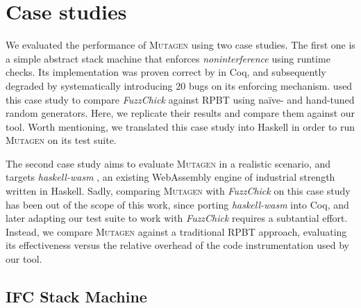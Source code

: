\documentclass[sigconf, anonymous, review]{acmart}
\newcommand{\fuzzchick}{\textit{FuzzChick}\xspace}
\newcommand{\mutagen}{\textsc{Mutagen}\xspace}
\begin{document}




\section{Case studies}
\label{sec:casestudies}

We evaluated the performance of \mutagen using two case studies.
%
The first one is a simple abstract stack machine that enforces
\emph{noninterference} \cite{goguen1982security} using runtime checks.
%
Its implementation was proven correct by \citeauthor{10.1145/2578855.2535839}
\citeyearpar{10.1145/2578855.2535839} in Coq, and subsequently degraded by
systematically introducing 20 bugs on its enforcing mechanism.
%
\citeauthor{lampropoulos2019coverage} used this case study to compare \fuzzchick
against RPBT using na\"ive- and hand-tuned random generators.
%
Here, we replicate their results and compare them against our tool.
%
Worth mentioning, we translated this case study into Haskell in order to run
\mutagen on its test suite.


The second case study aims to evaluate \mutagen in a realistic scenario, and
targets \textit{haskell-wasm} \cite{haskellwasm}, an existing WebAssembly engine
of industrial strength written in Haskell.
%
%
Sadly, comparing \mutagen with \fuzzchick on this case study has been out of the
scope of this work, since porting \textit{haskell-wasm} into Coq, and later
adapting our test suite to work with \fuzzchick requires a subtantial effort.
%
Instead, we compare \mutagen against a traditional RPBT approach, evaluating its
effectiveness versus the relative overhead of the code instrumentation used by
our tool.




\subsection{IFC Stack Machine}
\end{document}
